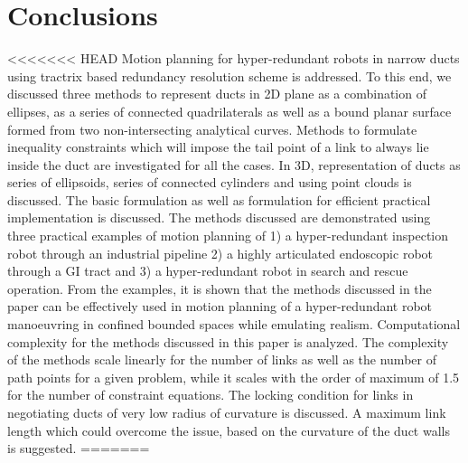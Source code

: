 \documentclass[12pt,a4]{article}
\begin{document}
\section{Conclusions}
\label{sec:conclusions}

<<<<<<< HEAD
Motion planning for hyper-redundant robots in narrow ducts using tractrix based redundancy resolution scheme is addressed. To this end, we discussed three methods to represent ducts in 2D plane as a combination of ellipses, as a series of connected quadrilaterals as well as a bound planar surface formed from two non-intersecting analytical curves. Methods to formulate inequality constraints which will impose the tail point of a link to always lie inside the duct are investigated for all the cases. In 3D, representation of ducts as series of ellipsoids, series of connected cylinders and using point clouds is discussed. The basic formulation as well as formulation for efficient practical implementation is discussed. The methods discussed are demonstrated using three practical examples of motion planning of 1) a hyper-redundant inspection robot through an industrial pipeline 2) a highly articulated endoscopic robot through a GI tract and 3) a hyper-redundant robot in search and rescue operation. From the examples, it is shown that the methods discussed in the paper can be effectively used in motion planning of a hyper-redundant robot manoeuvring in confined bounded spaces while emulating realism. Computational complexity for the methods discussed in this paper is analyzed. The complexity of the methods scale linearly for the number of links as well as the number of path points for a given problem, while it scales with the order of maximum of 1.5 for the number of constraint equations. The locking condition for links in negotiating ducts of very low radius of curvature is discussed. A maximum link length which could overcome the issue, based on the curvature of the duct walls is suggested.
=======
\end{document}
